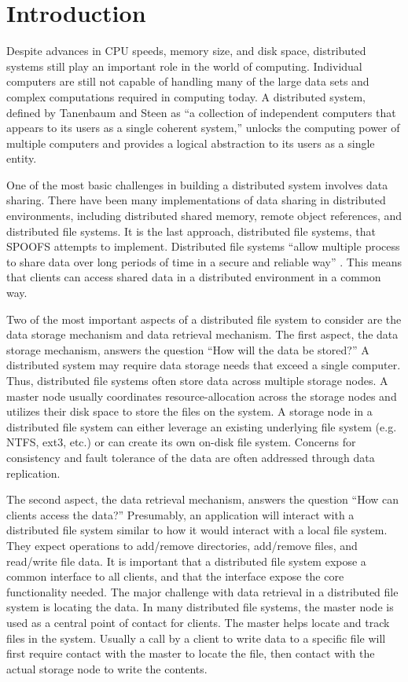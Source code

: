 
\section{Introduction}
\label{sec:introduction}

Despite advances in CPU speeds, memory size, and disk space, distributed systems still play an important role in the world of computing.  Individual computers are still not capable of handling many of the large data sets and complex computations required in computing today.  A distributed system, defined by Tanenbaum and Steen \cite{tanenbaum_text06} as ``a collection of independent computers that appears to its users as a single coherent system,'' unlocks the computing power of multiple computers and provides a logical abstraction to its users as a single entity.

One of the most basic challenges in building a distributed system involves data sharing.  There have been many implementations of data sharing in distributed environments, including distributed shared memory, remote object references, and distributed file systems.  It is the last approach, distributed file systems, that SPOOFS attempts to implement.  Distributed file systems ``allow multiple process to share data over long periods of time in a secure and reliable way'' \cite{tanenbaum_text06}.  This means that clients can access shared data in a distributed environment in a common way.

Two of the most important aspects of a distributed file system to consider are the data storage mechanism and data retrieval mechanism.  The first aspect, the data storage mechanism, answers the question ``How will the data be stored?''  A distributed system may require data storage needs that exceed a single computer.  Thus, distributed file systems often store data across multiple storage nodes.  A master node usually coordinates resource-allocation across the storage nodes and utilizes their disk space to store the files on the system.  A storage node in a distributed file system can either leverage an existing underlying file system (e.g. NTFS, ext3, etc.) or can create its own on-disk file system.  Concerns for consistency and fault tolerance of the data are often addressed through data replication.

The second aspect, the data retrieval mechanism, answers the question ``How can clients access the data?''  Presumably, an application will interact with a distributed file system similar to how it would interact with a local file system.  They expect operations to add/remove directories, add/remove files, and read/write file data.  It is important that a distributed file system expose a common interface to all clients, and that the interface expose the core functionality needed.  The major challenge with data retrieval in a distributed file system is locating the data.  In many distributed file systems, the master node is used as a central point of contact for clients.  The master helps locate and track files in the system.  Usually a call by a client to write data to a specific file will first require contact with the master to locate the file, then contact with the actual storage node to write the contents.

